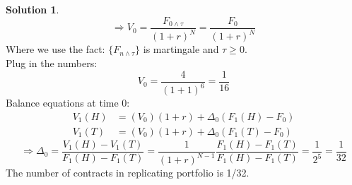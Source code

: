 \documentclass[a4paper, 10pt]{article}
\theoremstyle{definition}
\theoremstyle{hSol}
\newtheorem*{solution}{Solution}
\begin{document}
\begin{solution}
\begin{equation}
  \Rightarrow V_0 = \frac{F_{0 \wedge \tau}}{(1+r)^{N}} = \frac{F_{0}}{(1+r)^{N}} 
\end{equation}
Where we use the fact: $\{F_{n\wedge \tau}\}$ is martingale and $\tau \geq 0$.\\
Plug in the numbers:
\begin{equation}
  V_0 = \frac{4}{(1+1)^6} = \frac{1}{16}
\end{equation}
Balance equations at time $0$:
\begin{equation}
  \begin{split}
    V_1(H) &= (V_0)(1+r) + \Delta_0(F_1(H) - F_0)\\
    V_1(T) &= (V_0)(1+r) + \Delta_0(F_1(T) - F_0)
  \end{split}
\end{equation}
\begin{equation}
  \Rightarrow \Delta_0 = \frac{V_1(H)-V_1(T)}{F_1(H)-F_1(T)} = \frac{1}{(1+r)^{N-1}} \frac{F_1(H)-F_1(T)}{F_1(H)-F_1(T)} = \frac{1}{2^5} = \frac{1}{32}
\end{equation}
The number of contracts in replicating portfolio is 1/32.
\end{solution}
\end{document}
